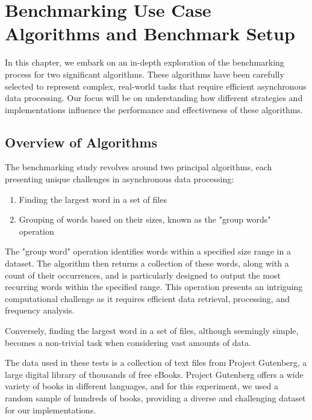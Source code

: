 

\lstset{basicstyle=\small\ttfamily, breaklines=true, frame=single}
\chapter{Benchmarking Use Case Algorithms and Benchmark Setup}
\label{cha:benchmarking_use_case_algorithms}

In this chapter, we embark on an in-depth exploration of the benchmarking process for two significant algorithms. These algorithms have been carefully selected to represent complex, real-world tasks that require efficient asynchronous data processing. Our focus will be on understanding how different strategies and implementations influence the performance and effectiveness of these algorithms.

\section{Overview of Algorithms}
\label{sec:algorithm_overview}

The benchmarking study revolves around two principal algorithms, each presenting unique challenges in asynchronous data processing:


\begin{enumerate}
\item Finding the largest word in a set of files
\item Grouping of words based on their sizes, known as the "group words" operation
\end{enumerate}

The "group word" operation identifies words within a specified size range in a dataset. The algorithm then returns a collection of these words, along with a count of their occurrences, and is particularly designed to output the most recurring words within the specified range. This operation presents an intriguing computational challenge as it requires efficient data retrieval, processing, and frequency analysis.

Conversely, finding the largest word in a set of files, although seemingly simple, becomes a non-trivial task when considering vast amounts of data.

The data used in these tests is a collection of text files from Project Gutenberg, a large digital library of thousands of free eBooks. Project Gutenberg offers a wide variety of books in different languages, and for this experiment, we used a random sample of hundreds of books, providing a diverse and challenging dataset for our implementations.

